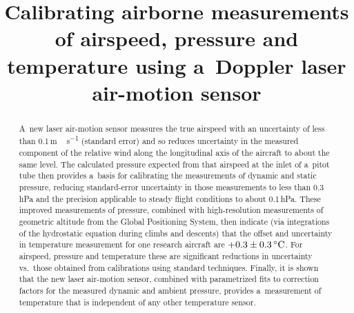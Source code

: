 \documentclass[amtd, online, hvmath]{copernicus}
\begin{document}
\hack{\sloppy}

\title{Calibrating airborne measurements of airspeed, pressure and temperature
using a~Doppler laser air-motion sensor}







\published{}



\maketitle


\begin{abstract}
  A~new laser air-motion sensor measures the true airspeed with an
  uncertainty of less than 0.1\,\unit{m\,s^{-1}} (standard error)
  and so reduces uncertainty in the measured component of the relative
  wind along the longitudinal axis of the aircraft to about the same
  level. The calculated pressure expected from that airspeed at the
  inlet of a~pitot tube then provides a~basis for calibrating the
  measurements of dynamic and static pressure, reducing standard-error
  uncertainty in those measurements to less than 0.3\,hPa and the
  precision applicable to steady flight conditions to about
  0.1\,hPa. These improved measurements of pressure, combined with
  high-resolution measurements of geometric altitude from the Global
  Positioning System, then indicate (via integrations of the
  hydrostatic equation during climbs and descents) that the offset and
  uncertainty in temperature measurement for one research aircraft are
  $+0.3\pm 0.3\,\unit{{\degree}C}$. For airspeed, pressure and temperature
  these are significant reductions in uncertainty vs.~those obtained
  from calibrations using standard techniques. Finally, it is shown
  that the new laser air-motion sensor, combined with parametrized
  fits to correction factors for the measured dynamic and ambient
  pressure, provides a~measurement of temperature that is independent
  of any other temperature sensor.
\end{abstract}
\end{document}

